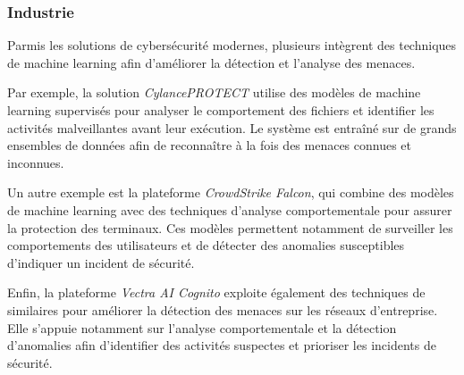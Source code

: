 \subsubsection{Industrie}\label{sec:Industrie} %
Parmis les solutions de cybersécurité modernes, plusieurs intègrent des techniques de machine learning afin d'améliorer la détection et l'analyse des menaces.

Par exemple, la solution \emph{CylancePROTECT} utilise des modèles de machine learning supervisés pour analyser le comportement des fichiers et identifier les activités malveillantes avant leur exécution.
Le système est entraîné sur de grands ensembles de données afin de reconnaître à la fois des menaces connues et inconnues. 

Un autre exemple est la plateforme \emph{CrowdStrike Falcon}, qui combine des modèles de machine learning avec des techniques d'analyse comportementale pour assurer la protection des terminaux. 
Ces modèles permettent notamment de surveiller les comportements des utilisateurs et de détecter des anomalies susceptibles d'indiquer un incident de sécurité.

Enfin, la plateforme \emph{Vectra AI Cognito} exploite également des techniques de similaires pour améliorer la détection des menaces sur les réseaux d'entreprise.
Elle s'appuie notamment sur l'analyse comportementale et la détection d'anomalies afin d'identifier des activités suspectes et prioriser les incidents de sécurité. 

